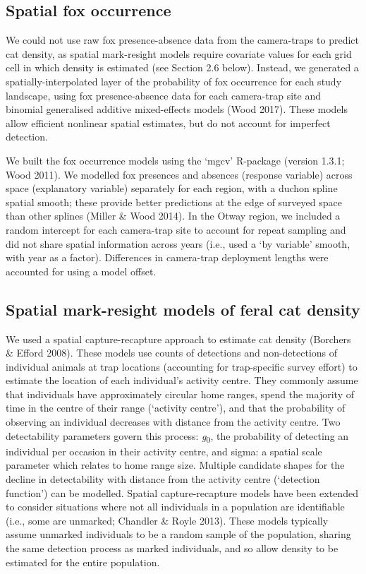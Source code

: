 \documentclass[]{elsarticle} %
\begin{document}
\hypertarget{spatial-fox-occurrence}{%
\subsection{Spatial fox occurrence}\label{spatial-fox-occurrence}}

We could not use raw fox presence-absence data from the camera-traps to predict cat density, as spatial mark-resight models require covariate values for each grid cell in which density is estimated (see Section 2.6 below). Instead, we generated a spatially-interpolated layer of the probability of fox occurrence for each study landscape, using fox presence-absence data for each camera-trap site and binomial generalised additive mixed-effects models (Wood 2017). These models allow efficient nonlinear spatial estimates, but do not account for imperfect detection.

We built the fox occurrence models using the `mgcv' R-package (version 1.3.1; Wood 2011). We modelled fox presences and absences (response variable) across space (explanatory variable) separately for each region, with a duchon spline spatial smooth; these provide better predictions at the edge of surveyed space than other splines (Miller \& Wood 2014). In the Otway region, we included a random intercept for each camera-trap site to account for repeat sampling and did not share spatial information across years (i.e., used a `by variable' smooth, with year as a factor). Differences in camera-trap deployment lengths were accounted for using a model offset.

\hypertarget{spatial-mark-resight-models-of-feral-cat-density}{%
\subsection{Spatial mark-resight models of feral cat density}\label{spatial-mark-resight-models-of-feral-cat-density}}

We used a spatial capture-recapture approach to estimate cat density (Borchers \& Efford 2008). These models use counts of detections and non-detections of individual animals at trap locations (accounting for trap-specific survey effort) to estimate the location of each individual's activity centre. They commonly assume that individuals have approximately circular home ranges, spend the majority of time in the centre of their range (`activity centre'), and that the probability of observing an individual decreases with distance from the activity centre. Two detectability parameters govern this process: \emph{g}\textsubscript{0}, the probability of detecting an individual per occasion in their activity centre, and sigma: a spatial scale parameter which relates to home range size. Multiple candidate shapes for the decline in detectability with distance from the activity centre (`detection function') can be modelled. Spatial capture-recapture models have been extended to consider situations where not all individuals in a population are identifiable (i.e., some are unmarked; Chandler \& Royle 2013). These models typically assume unmarked individuals to be a random sample of the population, sharing the same detection process as marked individuals, and so allow density to be estimated for the entire population.
\end{document}
